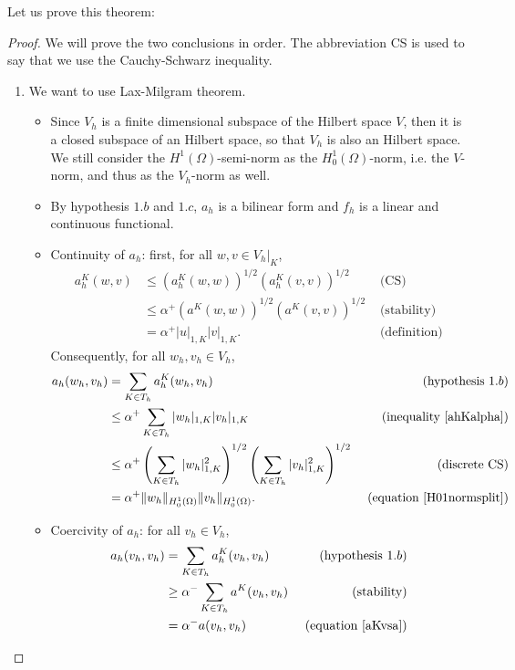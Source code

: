 \noindent Let us prove this theorem:
\begin{proof}
We will prove the two conclusions in order. The abbreviation CS is used to say that we use the Cauchy-Schwarz inequality.
\begin{enumerate}
\item We want to use Lax-Milgram theorem. 
\begin{itemize}
\item Since $V_h$ is a finite dimensional subspace of the Hilbert space $V$, then it is a closed subspace of an Hilbert space, so that $V_h$ is also an Hilbert space. We still consider the $H^1(\Omega)$-semi-norm as the $H_0^1(\Omega)$-norm, i.e. the $V$-norm, and thus as the $V_h$-norm as well.
\item By hypothesis $1.b$ and $1.c$, $a_h$ is a bilinear form and $f_h$ is a linear and continuous functional.
\item Continuity of $a_h$: first, for all $w,v\in V_h|_K$, 
\begin{align}
a_h^K(w,v) &\leq \left( a_h^K\left( w,w \right)\right)^{1/2}\left( a_h^K\left (v,v \right)\right)^{1/2} &\text{ (CS)} \nonumber \\
&\leq \alpha^+\left( a^K\left( w,w \right)\right)^{1/2}\left( a^K\left (v,v \right)\right)^{1/2} &\text{ (stability)} \nonumber \\
&= \alpha^+|u|_{1,K}|v|_{1,K}. &\text{ (definition)} \label{ahKalpha}
\end{align}
Consequently, for all $w_h, v_h \in V_h$, 
\begin{align*}
a_h(w_h,v_h) &= \sum_{K\in T_h} a_h^K(w_h,v_h) &\text{ (hypothesis }1.b)\\
&\leq \alpha^+\sum_{K\in T_h} |w_h|_{1,K}|v_h|_{1,K} &\text{ (inequality \ref{ahKalpha})}\\
&\leq \alpha^+\left( \sum_{K\in T_h}|w_h|_{1,K}^2 \right)^{1/2}\left( \sum_{K\in T_h}|v_h|_{1,K}^2 \right)^{1/2} &\text{ (discrete CS)}\\
&= \alpha^+ \|w_h\|_{H_0^1(\Omega)}\|v_h\|_{H_0^1(\Omega)}. &\text{ (equation \ref{H01normsplit})}
\end{align*}
\item Coercivity of $a_h$: for all $v_h\in V_h$, 
\begin{align*}
a_h(v_h,v_h) &= \sum_{K\in T_h} a_h^K(v_h,v_h) &\text{ (hypothesis }1.b)\\
&\geq \alpha^-\sum_{K\in T_h} a^K(v_h,v_h) &\text{ (stability)}\\
&= \alpha^- a(v_h,v_h) &\text{ (equation \ref{aKvsa})}\\

\end{align*}
\end{itemize}
\end{enumerate}
\end{proof}
